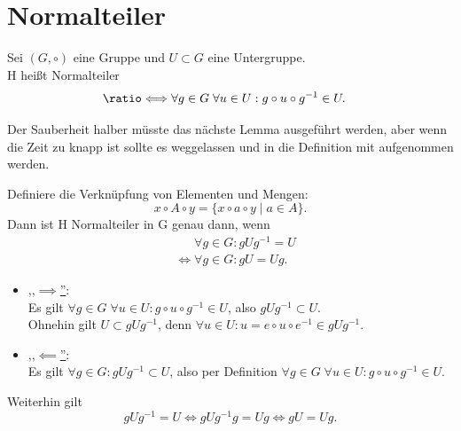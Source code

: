 \documentclass[a4paper]{article}
\newcommand*{\longeq}{\ratio\Longleftrightarrow}
\begin{document}
    \section{Normalteiler}
    \begin{definition}
        Sei $(G, \circ)$ eine Gruppe und $U \subset G$ eine Untergruppe. \\
        H heißt Normalteiler
        \begin{align*}
        &\longeq \forall g \in G \; \forall u \in U: g \circ u \circ g^{-1} \in U
        .\end{align*}    
    \end{definition}
    Der Sauberheit halber müsste das nächste Lemma ausgeführt werden, aber wenn die Zeit zu knapp ist sollte es weggelassen und in die Definition mit aufgenommen werden.
    \begin{lemma}
        Definiere die Verknüpfung von Elementen und Mengen: 
        \[
        x \circ A \circ y = \{x \circ a \circ y  \mid a \in A\}
        .\] 
        Dann ist H Normalteiler in G genau dann, wenn
        \begin{align*}
            &\phantom{\iff} \forall g \in G: g U g^{-1} = U \\
            &\iff \forall g \in G: g U = U g
        .\end{align*}
    \end{lemma}

    \begin{beweis}
        \begin{itemize}
            \item \underline{,,$\implies$''}: \\
                    Es gilt $\forall g \in G \; \forall u \in U: g \circ u \circ g^{-1} \in U$, also $g U g^{-1} \subset U$. \\
                    Ohnehin gilt $U \subset g U g^{-1}$, denn $\forall u \in U: u = e \circ u \circ e ^{-1} \in g U g^{-1}$.
                \item \underline{,,$\impliedby $''}: \\
                    Es gilt $\forall g \in G: g U g ^{-1} \subset U$, also per Definition $\forall g \in G \; \forall u \in U: g \circ u \circ g ^{-1} \in U$.
        \end{itemize}
        Weiterhin gilt
        \[
        g U g^{-1} = U \iff g U g^{-1} g = U g \iff g U = U g
        .\] 
    \end{beweis}
\end{document}
